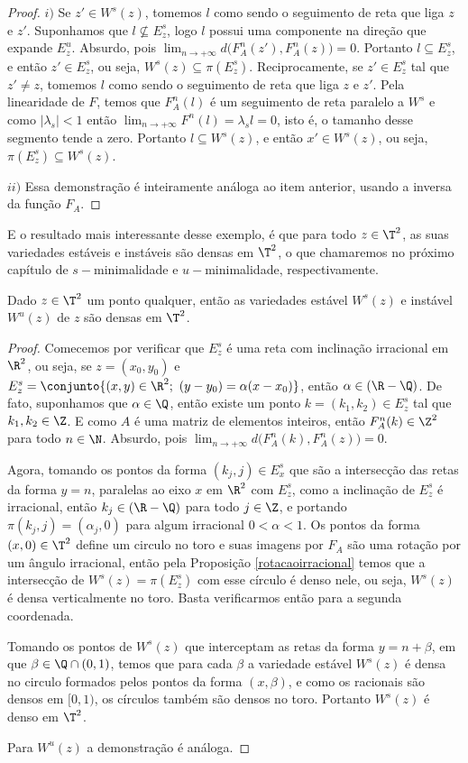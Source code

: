 \begin{proof} $i)$ Se $z'\in W^s(z)$, tomemos $l$ como sendo o seguimento de reta que liga $z$ e $z'$. Suponhamos que $l\nsubseteq E^s_z$, logo $l$ possui uma componente na direção que expande $E^u_z$. Absurdo, pois $\lim_{n\to+\infty}d\big(F_A^n(z'),F_A^n(z)\big)=0$. Portanto $l\subseteq E^s_z$, e então $z'\in E^s_z$, ou seja, $W^s(z)\subseteq\pi(E^s_z)$. Reciprocamente, se $z'\in E^s_z$ tal que $z'\neq z$, tomemos $l$ como sendo o seguimento de reta que liga $z$ e $z'$. Pela linearidade de $F$, temos que $F_A^n(l)$ é um seguimento de reta paralelo a $W^s$ e como $|\lambda_s|<1$ então $\lim_{n\to+\infty}F^n(l)=\lambda_sl=0$, isto é, o tamanho desse segmento tende a zero. Portanto $l\subseteq W^s(z)$, e então $x'\in W^s(z)$, ou seja, $\pi(E^s_z)\subseteq W^s(z)$.

$ii)$ Essa demonstração é inteiramente análoga ao item anterior, usando a inversa da função $F_A$.
\end{proof}

E o resultado mais interessante desse exemplo, é que para todo $z\in\T^2$, as suas variedades estáveis e instáveis são densas em $\T^2$, o que chamaremos no próximo capítulo de $s-$minimalidade e $u-$minimalidade, respectivamente.

\begin{proposicao} Dado $z\in\T^2$ um ponto qualquer, então as variedades estável $W^s(z)$ e instável $W^u(z)$ de $z$ são densas em $\T^2$.
\end{proposicao}

\begin{proof} Comecemos por verificar que $E^s_z$ é uma reta com inclinação irracional em $\R^2$, ou seja, se $z=(x_0,y_0)$ e $E^s_z=\conjunto{(x,y)\in \R^2;\ (y-y_0)=\alpha(x-x_0)}$, então $\alpha\in(\R-\Q)$. De fato, suponhamos que $\alpha\in\Q$, então existe um ponto $k=(k_1,k_2)\in E^s_z$ tal que $k_1,k_2\in\Z$. E como $A$ é uma matriz de elementos inteiros, então $F_A^n(k)\in\Z^2$ para todo $n\in\N$. Absurdo, pois $\lim_{n\to+\infty}d\big(F_A^n(k),F_A^n(z)\big)=0$. 

Agora, tomando os pontos da forma $(k_j,j)\in E^s_x$ que são a intersecção das retas da forma $y=n$, paralelas ao eixo $x$ em $\R^2$ com $E^s_z$, como a inclinação de $E^s_z$ é irracional, então $k_j\in(\R-\Q)$ para todo $j\in\Z$, e portando $\pi(k_j,j)=(\alpha_j,0)$ para algum irracional $0<\alpha<1$. Os pontos da forma $(x,0)\in\T^2$ define um circulo no toro e suas imagens por $F_A$ são uma rotação por um ângulo irracional, então pela Proposição \ref{rotacaoirracional} temos que a intersecção de $W^s(z)=\pi(E^s_z)$ com esse círculo é denso nele, ou seja, $W^s(z)$ é densa verticalmente no toro. Basta verificarmos então para a segunda coordenada.

Tomando os pontos de $W^s(z)$ que interceptam as retas da forma $y=n+\beta$, em que $\beta\in\Q\cap(0,1)$, temos que para cada $\beta$ a variedade estável $W^s(z)$ é densa no circulo formados pelos pontos da forma $(x,\beta)$, e como os racionais são densos em $[0,1)$, os círculos também são densos no toro. Portanto $W^s(z)$ é denso em $\T^2$.

Para $W^u(z)$ a demonstração é análoga.
\end{proof}



